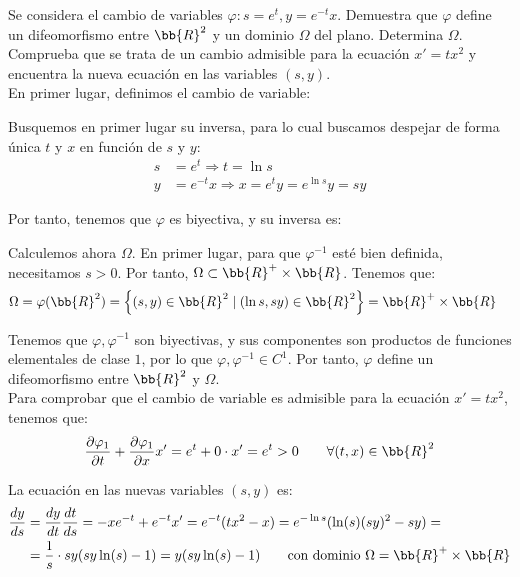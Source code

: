 \documentclass[12pt]{article}
\begin{document}
    \begin{ejercicio}
        Se considera el cambio de variables $\varphi : s = e^t, y = e^{-t}x$. Demuestra que $\varphi$ define un difeomorfismo entre $\bb{R}^2$ y un dominio $\Omega$ del plano.
        Determina $\Omega$.
        Comprueba que se trata de un cambio admisible para la ecuación $x' = tx^2$ y encuentra la nueva ecuación en las variables $(s,y)$.\\

        En primer lugar, definimos el cambio de variable:

        Busquemos en primer lugar su inversa, para lo cual buscamos despejar de forma única $t$ y $x$ en función de $s$ y $y$:
        \begin{align*}
            s &= e^t \Longrightarrow t = \ln s\\
            y &= e^{-t}x \Longrightarrow x= e^ty = e^{\ln s}y = sy
        \end{align*}

        Por tanto, tenemos que $\varphi$ es biyectiva, y su inversa es:

        Calculemos ahora $\Omega$. En primer lugar, para que $\varphi^{-1}$ esté bien definida, necesitamos $s>0$. Por tanto, $\Omega\subset \bb{R}^+\times \bb{R}$. Tenemos que:
        \begin{align*}
            \Omega &= \varphi(\bb{R}^2) = \left\{(s,y)\in \bb{R}^2 \mid \left(\ln s, sy\right)\in \bb{R}^2\right\} = \bb{R}^+\times \bb{R}
        \end{align*}
        
        Tenemos que $\varphi,\varphi^{-1}$ son biyectivas, y sus componentes son productos de funciones elementales de clase $1$, por lo que $\varphi,\varphi^{-1}\in C^1$. Por tanto, $\varphi$ define un difeomorfismo entre $\bb{R}^2$ y $\Omega$.\\

        Para comprobar que el cambio de variable es admisible para la ecuación $x'=tx^2$, tenemos que:
        \begin{align*}
            \dfrac{\partial \varphi_1}{\partial t} + \dfrac{\partial \varphi_1}{\partial x}x' 
            = e^t + 0\cdot x' = e^t > 0 \qquad \forall (t,x)\in \bb{R}^2
        \end{align*}

        La ecuación en las nuevas variables $(s,y)$ es:
        \begin{align*}
            \dfrac{dy}{ds} &= \dfrac{dy}{dt}\dfrac{dt}{ds} = -xe^{-t} + e^{-t}x' =e^{-t}(tx^2-x)
            = e^{-\ln s}(\ln (s)(sy)^2-sy) =\\&= \dfrac{1}{s}\cdot sy(sy\ln (s)-1) = y(sy\ln (s)-1)
            \qquad \text{con dominio } \Omega = \bb{R}^+\times \bb{R}
        \end{align*}

    \end{ejercicio}
\end{document}
